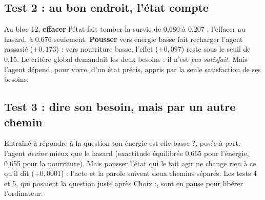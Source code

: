 \documentclass[fontsize=10pt,paper=a4,parskip=half-]{scrartcl}
\newcommand{\q}[1]{\og #1\fg{}}
\begin{document}
\subsection{Test 2 : au bon endroit, l'état compte}
Au bloc 12, \textbf{effacer} l'état fait tomber la survie de 0,680 à 0,207 ; l'effacer au
hasard, à 0,676 seulement. \textbf{Pousser} vers \q{énergie basse} fait recharger l'agent
rassasié ($+0,173$) ; vers \q{nourriture basse}, l'effet ($+0,097$) reste sous le seuil de
0,15. Le critère global demandait les deux besoins : il n'est \emph{pas satisfait}. Mais
l'agent dépend, pour vivre, d'un état précis, appris par la seule satisfaction de ses besoins.

\subsection{Test 3 : dire son besoin, mais par un autre chemin}
Entraîné à répondre à la question \q{ton énergie est-elle basse ?}, posée à part, l'agent
\emph{devine} mieux que le hasard (exactitude équilibrée 0,665 pour l'énergie, 0,655 pour la
nourriture). Mais pousser l'état qui le fait agir ne change rien à ce qu'il dit
($+0,0001$) : l'acte et la parole suivent deux chemins séparés. Les tests 4 et 5, qui
posaient la question juste après \q{Choix :}, sont en pause pour libérer l'ordinateur.
\end{document}
